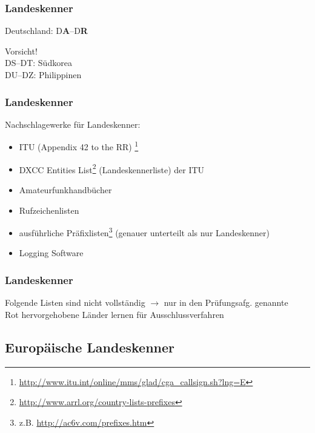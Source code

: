 \begin{frame}
    \frametitle{Landeskenner}

    \begin{center}
        Deutschland: D\textbf{A}--D\textbf{R} \\[1em]
    \end{center}

    Vorsicht! \\
    DS--DT: Südkorea \\
    DU--DZ: Philippinen \\[1em]

\end{frame}

\begin{frame}
    \frametitle{Landeskenner}

    Nachschlagewerke für Landeskenner:

    \begin{itemize}
        \item ITU (Appendix 42 to the RR)
              \footnote{\scriptsize\url{http://www.itu.int/online/mms/glad/cga_callsign.sh?lng=E}}
        \item DXCC Entities List\footnote{\scriptsize\url{http://www.arrl.org/country-lists-prefixes}}
              (Landeskennerliste) der ITU
        \item Amateurfunkhandbücher
        \item Rufzeichenlisten
        \item ausführliche Präfixlisten\footnote{\scriptsize z.B. \url{http://ac6v.com/prefixes.htm}}
              (genauer unterteilt als nur Landeskenner)
        \item Logging Software
    \end{itemize}

\end{frame}

\begin{frame}
    \frametitle{Landeskenner}

    Folgende Listen sind nicht vollständig
    $\rightarrow$ nur in den Prüfungsafg. genannte \\[3em]

    \alert{Rot hervorgehobene Länder lernen} für Ausschlussverfahren

\end{frame}

\subsection{Europäische Landeskenner}


